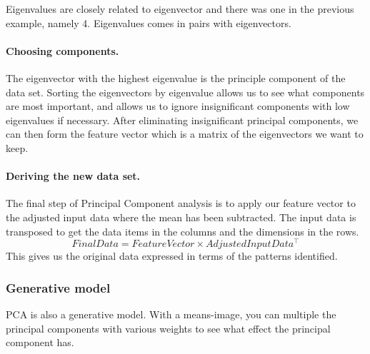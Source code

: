 Eigenvalues are closely related to eigenvector and there was one in the previous example, namely 4.
Eigenvalues comes in pairs with eigenvectors.

\paragraph{Choosing components.}
The eigenvector with the highest eigenvalue is the principle component of the data set.
Sorting the eigenvectors by eigenvalue allows us to see what components are most important, and allows us to ignore insignificant components with low eigenvalues if necessary.
After eliminating insignificant principal components, we can then form the feature vector which is a matrix of the eigenvectors we want to keep.


\paragraph{Deriving the new data set.}
The final step of Principal Component analysis is to apply our feature vector to the adjusted input data where the mean has been subtracted.
The input data is transposed to get the data items in the columns and the dimensions in the rows.
$$FinalData = FeatureVector\times AdjustedInputData^\top $$ %
This gives us the original data expressed in terms of the patterns identified.


\subsubsection{Generative model}
PCA is also a generative model.
With a means-image, you can multiple the principal components with various weights to see what effect the principal component has.

